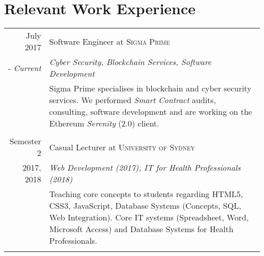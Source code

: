 \documentclass[10pt]{article}
\begin{document}
\section{Relevant Work Experience}
\begin{tabular}{r|p{11cm}}
    July 2017 & Software Engineer at \textsc{Sigma Prime}\\ - \emph{Current} & \emph{Cyber Security, Blockchain Services, Software Development}\\ & Sigma Prime specialises in blockchain and cyber security services. We performed \textit{Smart Contract} audits, consulting, software development and are working on the Ethereum \textit{Serenity} (2.0) client.\\\multicolumn{2}{c}{} \\

    Semester 2 & Casual Lecturer at \textsc{University of Sydney} \\ 2017, 2018 & \emph{Web Development (2017), IT for Health Professionals (2018)} \\ &\footnotesize{Teaching core concepts to students regarding HTML5, CSS3, JavaScript, Database Systems (Concepts, SQL, Web Integration). Core IT systems (Spreadsheet, Word, Microsoft Access) and Database Systems for Health Professionals}.\\\multicolumn{2}{c}{} \\


\end{tabular}
\end{document}
